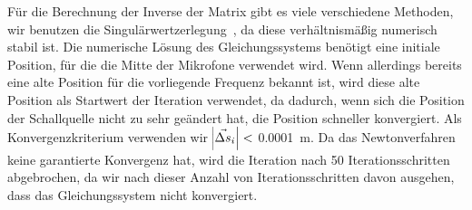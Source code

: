 Für die Berechnung der Inverse der Matrix gibt es viele verschiedene Methoden, wir benutzen die Singulärwertzerlegung~\cite{muthsam2006lineare}, da diese verhältnismäßig numerisch stabil ist. Die numerische Lösung des Gleichungssystems benötigt eine initiale Position, für die die Mitte der Mikrofone verwendet wird. Wenn allerdings bereits eine alte Position für die vorliegende Frequenz bekannt ist, wird diese alte Position als Startwert der Iteration verwendet, da dadurch, wenn sich die Position der Schallquelle nicht zu sehr geändert hat, die Position schneller konvergiert. Als Konvergenzkriterium verwenden wir $\abs{\vec{\Delta{s}}_i} <$ \SI{0.0001}{\meter}. Da das Newtonverfahren keine garantierte Konvergenz hat, wird die Iteration nach \num{50} Iterationsschritten abgebrochen, da wir nach dieser Anzahl von Iterationsschritten davon ausgehen, dass das Gleichungssystem nicht konvergiert.


